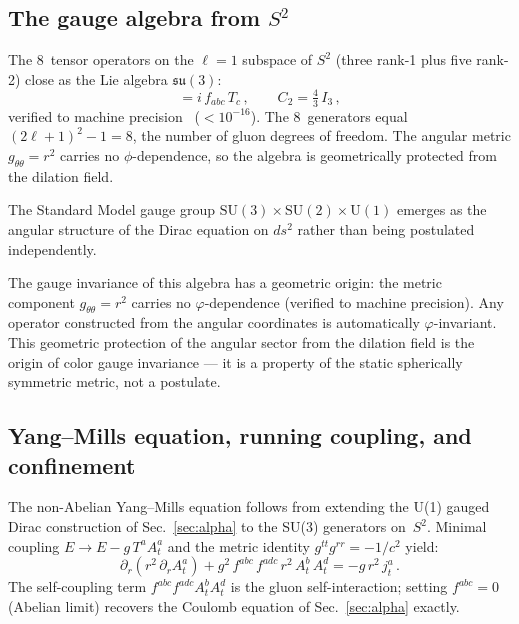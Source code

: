 \documentclass[aps,prd,twocolumn,superscriptaddress,nofootinbib,longbibliography]{revtex4-2}
\begin{document}
\subsection{The gauge algebra from $S^2$}

The 8~tensor operators on the $\ell = 1$ subspace of $S^2$ (three
rank-1 plus five rank-2) close as the Lie algebra
$\mathfrak{su}(3)$:
\begin{equation}
  [T_a, T_b] = i\,f_{abc}\,T_c\,,
  \qquad C_2 = \tfrac{4}{3}\,I_3\,,
\end{equation}
verified to machine precision~\cite{GellMann1964} ($< 10^{-16}$).  The 8~generators
equal $(2\ell+1)^2 - 1 = 8$, the number of gluon degrees of
freedom.  The angular metric $g_{\theta\theta} = r^2$ carries no
$\phi$-dependence, so the algebra is geometrically protected from the
dilation field.

The Standard Model gauge group $\mathrm{SU}(3) \times
\mathrm{SU}(2) \times \mathrm{U}(1)$ emerges as the angular
structure of the Dirac equation on $ds^2$ rather than being
postulated independently.

The gauge invariance of this algebra has a geometric origin: the
metric component $g_{\theta\theta} = r^2$ carries no
$\varphi$-dependence (verified to machine precision).  Any operator
constructed from the angular coordinates is automatically
$\varphi$-invariant.  This geometric protection of the angular sector
from the dilation field is the origin of color gauge invariance --- it
is a property of the static spherically symmetric metric, not a
postulate.

\subsection{Yang--Mills equation, running coupling, and confinement}

The non-Abelian Yang--Mills equation follows from extending the U(1)
gauged Dirac construction of Sec.~\ref{sec:alpha} to the SU(3)
generators on~$S^2$.  Minimal coupling $E \to E - g\,T^a A^a_t$ and
the metric identity $g^{tt}g^{rr} = -1/c^2$ yield:
\begin{equation}\label{eq:yang-mills}
  \partial_r\!\left(r^2\,\partial_r A^a_t\right)
  + g^2\,f^{abc}\,f^{adc}\,r^2\,A^b_t\,A^d_t
  = -g\,r^2\,j^a_t\,.
\end{equation}
The self-coupling term $f^{abc}f^{adc}A^b_t A^d_t$ is the gluon
self-interaction; setting $f^{abc} = 0$ (Abelian limit) recovers the
Coulomb equation of Sec.~\ref{sec:alpha} exactly.
\end{document}
